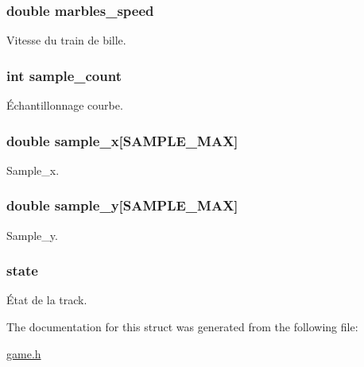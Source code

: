 \subsubsection[{\texorpdfstring{marbles\+\_\+speed}{marbles_speed}}]{\setlength{\rightskip}{0pt plus 5cm}double marbles\+\_\+speed}\hypertarget{struct_track_a4acb65a6d65a7958036ed901abe0a6bb}{}\label{struct_track_a4acb65a6d65a7958036ed901abe0a6bb}
Vitesse du train de bille. 
\subsubsection[{\texorpdfstring{sample\+\_\+count}{sample_count}}]{\setlength{\rightskip}{0pt plus 5cm}int sample\+\_\+count}\hypertarget{struct_track_a9e0d21871ffe556f58524ae0eab311b4}{}\label{struct_track_a9e0d21871ffe556f58524ae0eab311b4}
Échantillonnage courbe. 
\subsubsection[{\texorpdfstring{sample\+\_\+x}{sample_x}}]{\setlength{\rightskip}{0pt plus 5cm}double sample\+\_\+x\mbox{[}S\+A\+M\+P\+L\+E\+\_\+\+M\+AX\mbox{]}}\hypertarget{struct_track_aa3ed1a4220174d38001d02282fbee22b}{}\label{struct_track_aa3ed1a4220174d38001d02282fbee22b}
Sample\+\_\+x. 
\subsubsection[{\texorpdfstring{sample\+\_\+y}{sample_y}}]{\setlength{\rightskip}{0pt plus 5cm}double sample\+\_\+y\mbox{[}S\+A\+M\+P\+L\+E\+\_\+\+M\+AX\mbox{]}}\hypertarget{struct_track_a44edcc22cd2d982e8d90baa5aed0d36f}{}\label{struct_track_a44edcc22cd2d982e8d90baa5aed0d36f}
Sample\+\_\+y. 
\subsubsection[{\texorpdfstring{state}{state}}]{ state}\hypertarget{struct_track_aadbac9f12492034fea9600a5ce4c7c5f}{}\label{struct_track_aadbac9f12492034fea9600a5ce4c7c5f}
État de la track. 

The documentation for this struct was generated from the following file\+:\begin{DoxyCompactItemize}
\item 
\hyperlink{game_8h}{game.\+h}\end{DoxyCompactItemize}
